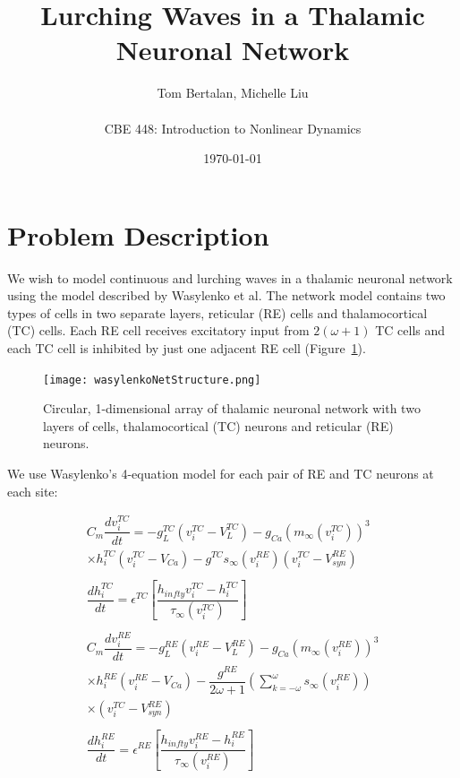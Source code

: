 \documentclass[12pt,letterpaper,oneside,openany]{article}
\begin{document}
\author{Tom Bertalan, Michelle Liu\\~ \\CBE 448: Introduction to Nonlinear Dynamics}
\title{Lurching Waves in a Thalamic Neuronal Network}
\date{\mydate\today}

\maketitle


\section{Problem Description}

We wish to model continuous and lurching waves in a thalamic neuronal network using the model described by Wasylenko et al.\cite{Wasylenko2010} The network model contains two types of cells in two separate layers, reticular (RE) cells and thalamocortical (TC) cells. Each RE cell receives excitatory input from $2(\omega+1)$ TC cells and each TC cell is inhibited by just one adjacent RE cell (Figure~\ref{fig:network}).

\begin{figure}[t]
  \centering
  \texttt{[image: wasylenkoNetStructure.png]}
  \caption{Circular, 1-dimensional array of thalamic neuronal network with two layers of cells, thalamocortical (TC) neurons and reticular (RE) neurons.}
  \label{fig:network}
\end{figure}

We use Wasylenko's 4-equation model for each pair of RE and TC neurons at each site:

\begin{eqnarray}
  \label{eq:ODEs}
C_m \dfrac{dv_i^{TC}}{dt} = -g_L^{TC}(v_i^{TC} - V_L^{TC}) - g_{Ca}(m_{\infty}(v_i^{TC}))^3 \nonumber \\
\times h_i^{TC}(v_i^{TC} - V_{Ca}) - g^{TC}s_{\infty}(v_i^{RE})(v_i^{TC} - V_{syn}^{RE})\\
\nonumber \\
\dfrac{dh_i^{TC}}{dt} = \epsilon^{TC}\left[\dfrac{h_{infty}v_i^{TC}-h_i^{TC}}{\tau_{\infty}(v_i^{TC})}\right]\\
\nonumber \\
C_m \dfrac{dv_i^{RE}}{dt} = -g_L^{RE}(v_i^{RE} - V_L^{RE}) - g_{Ca}(m_{\infty}(v_i^{RE}))^3 \nonumber \\
\times h_i^{RE}(v_i^{RE} - V_{Ca}) - \dfrac{g^{RE}}{2 \omega + 1} \left( \sum_{k=-\omega}^{\omega} s_{\infty}(v_i^{RE})\right)\nonumber \\
\times (v_i^{TC} - V_{syn}^{RE})\\
\nonumber \\
\dfrac{dh_i^{RE}}{dt} = \epsilon^{RE}\left[\dfrac{h_{infty}v_i^{RE}-h_i^{RE}}{\tau_{\infty}(v_i^{RE})}\right]
\end{eqnarray}
\end{document}
